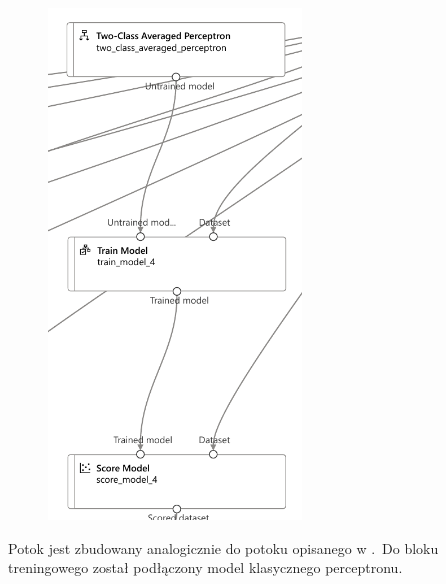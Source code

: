 \begin{figure}[H]
    \centering
    \includegraphics[width=0.6\textwidth]{images/ap_pipe}
    \label{fig:ap-pipe}
\end{figure}

Potok jest zbudowany analogicznie do potoku opisanego w .\ Do bloku treningowego został podłączony model klasycznego perceptronu.

\vfill
\pagebreak

